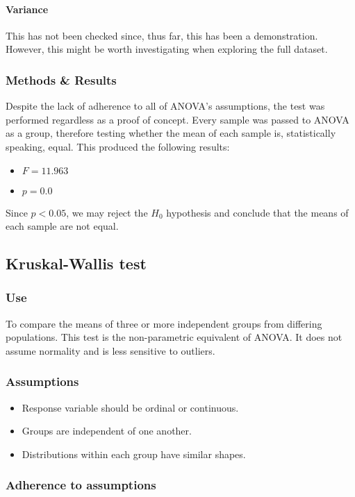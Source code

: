 \paragraph{Variance}
This has not been checked since, thus far, this has been a demonstration.
However, this might be worth investigating when exploring the full dataset.

\subsubsection{Methods \& Results}
Despite the lack of adherence to all of ANOVA's assumptions, the test was performed regardless as a proof of concept.
Every sample was passed to ANOVA as a group, therefore testing whether the mean of each sample is, statistically speaking, equal.
This produced the following results:
\begin{itemize}
    \item $F = 11.963$
    \item $p = 0.0$
\end{itemize}

Since $p < 0.05$, we may reject the $H_0$ hypothesis and conclude that the means of each sample are not equal.

\subsection{Kruskal-Wallis test}

\subsubsection{Use}
To compare the means of three or more independent groups from differing populations.
This test is the non-parametric equivalent of ANOVA.
It does not assume normality and is less sensitive to outliers.

\subsubsection{Assumptions}
\begin{itemize}
    \item Response variable should be ordinal or continuous.
    \item Groups are independent of one another.
    \item Distributions within each group have similar shapes.
\end{itemize}

\subsubsection{Adherence to assumptions}
